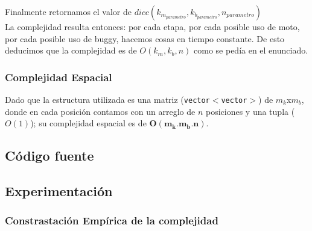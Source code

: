 Finalmente retornamos el valor de $dicc(k_{m_{parametro}},k_{b_{parametro}},n_{parametro})$\\

La complejidad resulta entonces: por cada etapa, por cada posible uso de moto, por cada posible uso de buggy, hacemos cosas en tiempo constante. De esto deducimos que la complejidad es de $O(k_{m},k_{b},n)$ como se ped\'ia en el enunciado.

\subsubsection{Complejidad Espacial}
Dado que la estructura utilizada es una matriz (\texttt{vector$<$vector$>$}) de $m_k$x$m_b$, donde en cada posici\'on contamos con un arreglo de $n$ posiciones y una tupla ($O(1)$); su complejidad espacial es de $\mathbf{O(m_k.m_b.n)}$.

\newpage
\subsection{C\'odigo fuente}

\newpage
\subsection{Experimentaci\'on}

\subsubsection{Constrastaci\'on Emp\'irica de la complejidad}
